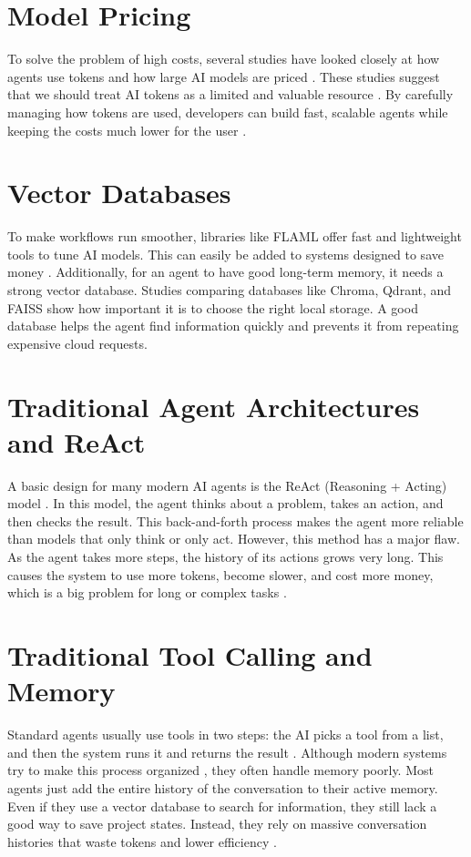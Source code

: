 \section{Model Pricing}
To solve the problem of high costs, several studies have looked closely at how agents use tokens and how large AI models are priced \cite{token_economics, ai_tokenomics}. These studies suggest that we should treat AI tokens as a limited and valuable resource \cite{marginal_token}. By carefully managing how tokens are used, developers can build fast, scalable agents while keeping the costs much lower for the user \cite{efficient_agents}.\\

\section{Vector Databases}
To make workflows run smoother, libraries like FLAML \cite{flaml} offer fast and lightweight tools to tune AI models. This can easily be added to systems designed to save money \cite{cost_aware_automl}. Additionally, for an agent to have good long-term memory, it needs a strong vector database. Studies comparing databases like Chroma, Qdrant, and FAISS \cite{chroma_faiss_analysis} show how important it is to choose the right local storage. A good database helps the agent find information quickly and prevents it from repeating expensive cloud requests.\\

\section{Traditional Agent Architectures and ReAct}
A basic design for many modern AI agents is the ReAct (Reasoning + Acting) model \cite{yao2023react}. In this model, the agent thinks about a problem, takes an action, and then checks the result. This back-and-forth process makes the agent more reliable than models that only think or only act. However, this method has a major flaw. As the agent takes more steps, the history of its actions grows very long. This causes the system to use more tokens, become slower, and cost more money, which is a big problem for long or complex tasks \cite{token_economics, efficient_agents}.\\

\section{Traditional Tool Calling and Memory}
Standard agents usually use tools in two steps: the AI picks a tool from a list, and then the system runs it and returns the result \cite{efficient_tool_select}. Although modern systems try to make this process organized \cite{langchain_langgraph}, they often handle memory poorly. Most agents just add the entire history of the conversation to their active memory. Even if they use a vector database to search for information, they still lack a good way to save project states. Instead, they rely on massive conversation histories that waste tokens and lower efficiency \cite{ai_agent-memory}.\\

